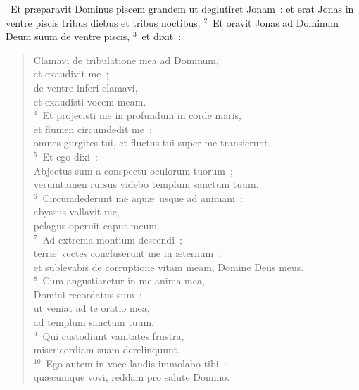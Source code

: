 ~\lettrine[lines=10,image=true,loversize=0.05,lraise=-0.03]{E}{}t pr\ae paravit Dominus piscem grandem ut deglutiret Jonam~: et erat Jonas in ventre piscis tribus diebus et tribus noctibus.
${}^{2}$~Et oravit Jonas ad Dominum Deum suum de ventre piscis,
${}^{3}$~et dixit~: \begin{flushleft}\begin{verse}Clamavi de tribulatione mea ad Dominum,\\ et exaudivit me~;\\ de ventre inferi clamavi,\\ et exaudisti vocem meam.\\
${}^{4}$~Et projecisti me in profundum in corde maris,\\ et flumen circumdedit me~:\\ omnes gurgites tui, et fluctus tui super me transierunt.\\
${}^{5}$~Et ego dixi~:\\ Abjectus sum a conspectu oculorum tuorum~;\\ verumtamen rursus videbo templum sanctum tuum.\\
${}^{6}$~Circumdederunt me aqu\ae\ usque ad animam~:\\ abyssus vallavit me,\\ pelagus operuit caput meum.\\
${}^{7}$~Ad extrema montium descendi~;\\ terr\ae\ vectes concluserunt me in \ae ternum~:\\ et sublevabis de corruptione vitam meam, Domine Deus meus.\\
${}^{8}$~Cum angustiaretur in me anima mea,\\ Domini recordatus sum~:\\ ut veniat ad te oratio mea,\\ ad templum sanctum tuum.\\
${}^{9}$~Qui custodiunt vanitates frustra,\\ misericordiam suam derelinquunt.\\
${}^{10}$~Ego autem in voce laudis immolabo tibi~:\\ qu\ae cumque vovi, reddam pro salute Domino.\end{verse}\end{flushleft}


